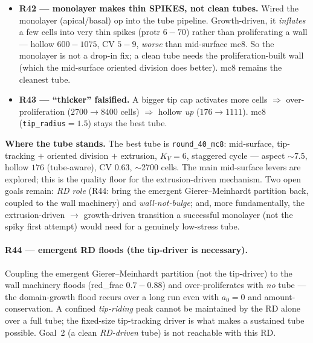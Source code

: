 \documentclass[11pt]{article}
\begin{document}
\begin{itemize}
is therefore the growth-driven mechanism --- which is what the \textbf{monolayer (apical/basal) operator}
supplies (true per-cell 3D volume, emergent bending: localized volume growth on a monolayer shell
\emph{buckles} into a tube as its equilibrium). \texttt{round\_42+} wire it into the tube pipeline.
\item \textbf{R42 --- monolayer makes thin SPIKES, not clean tubes.} Wired the monolayer (apical/basal) op
into the tube pipeline. Growth-driven, it \emph{inflates} a few cells into very thin spikes (protr $6\!-\!70$)
rather than proliferating a wall --- hollow $600\!-\!1075$, CV $5\!-\!9$, \emph{worse} than mid-surface mc8.
So the monolayer is not a drop-in fix; a clean tube needs the proliferation-built wall (which the mid-surface
oriented division does better). mc8 remains the cleanest tube.
\item \textbf{R43 --- ``thicker'' falsified.} A bigger tip cap activates more cells $\Rightarrow$
over-proliferation ($2700\!\to\!8400$ cells) $\Rightarrow$ hollow \emph{up} ($176\!\to\!1111$). mc8
(\texttt{tip\_radius}$=1.5$) stays the best tube.
\end{itemize}
\textbf{Where the tube stands.} The best tube is \texttt{round\_40\_mc8}: mid-surface, tip-tracking $+$
oriented division $+$ extrusion, $K_V\!=\!6$, staggered cycle --- aspect $\sim$7.5, hollow $176$ (tube-aware),
CV $0.63$, $\sim$2700 cells. The main mid-surface levers are explored; this is the quality floor for the
extrusion-driven mechanism. Two open goals remain: \emph{RD role} (R44: bring the emergent Gierer--Meinhardt
partition back, coupled to the wall machinery) and \emph{wall-not-bulge}; and, more fundamentally, the
extrusion-driven $\to$ growth-driven transition a successful monolayer (not the spiky first attempt) would
need for a genuinely low-stress tube.

\paragraph{R44 --- emergent RD floods (the tip-driver is necessary).} Coupling the emergent Gierer--Meinhardt
partition (not the tip-driver) to the wall machinery floods (red\_frac $0.7\!-\!0.88$) and over-proliferates
with \emph{no} tube --- the domain-growth flood recurs over a long run even with $a_0\!=\!0$ and
amount-conservation. A confined \emph{tip-riding} peak cannot be maintained by the RD alone over a full tube;
the fixed-size tip-tracking driver is what makes a sustained tube possible. Goal~2 (a clean \emph{RD-driven}
tube) is not reachable with this RD.
\end{document}
